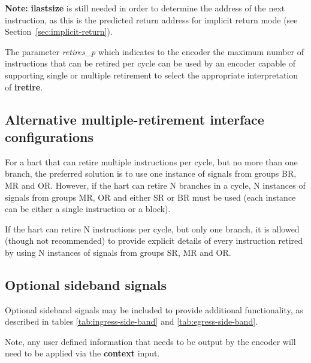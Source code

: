 \textbf{Note:} \textbf{ilastsize} is still needed in order to determine the address of the next 
instruction, as this is the predicted return address for implicit return mode 
(see Section~\ref{sec:implicit-return}).

The parameter \textit{retires\_p} which indicates to the encoder the maximum number of 
instructions that can be retired per cycle can be used by an encoder capable of supporting single or 
multiple retirement to select the appropriate interpretation of \textbf{iretire}.  


\subsection{Alternative multiple-retirement interface configurations} \label{sec:alt-multi}

For a hart that can retire multiple instructions per cycle, but no more than one branch, the preferred 
solution is to use one instance of signals from groups BR, MR and OR.  However, if the hart can retire 
N branches in a cycle, N instances of signals from groups MR, OR and either SR or BR must be used 
(each instance can be either a single instruction or a block).

If the hart can retire N instructions per cycle, but only one branch, it is allowed (though not recommended)
to provide explicit details of every instruction retired by using N instances of signals from groups
SR, MR and OR.

\subsection{Optional sideband signals}

Optional sideband signals may be included to provide additional functionality, as described in
tables \ref{tab:ingress-side-band} and \ref{tab:egress-side-band}.

Note, any user defined information that needs to be output by the encoder
will need to be applied via the \textbf{context} input.

